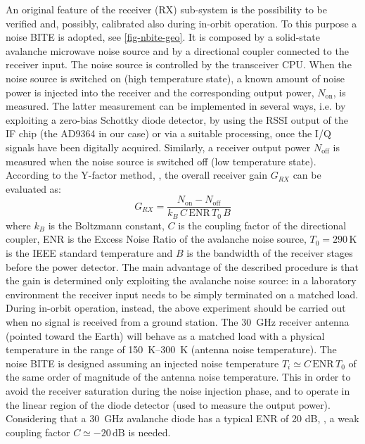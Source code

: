 \documentclass[conference,10pt,a4paper]{IEEEtran}%
\begin{document}
An original feature of the receiver (RX) sub-system is the possibility to be verified and, possibly, calibrated also during in-orbit operation.
To this purpose a noise BITE is adopted, see \cref{fig-nbite-geo}.
It is composed by a solid-state avalanche microwave noise source and by a directional coupler connected to the receiver input.
The noise source is controlled by the transceiver CPU.
When the noise source is switched on (high temperature state), a known amount of noise power is injected into the receiver and the corresponding output power, $N_\text{on}$, is measured.
The latter measurement can be implemented in several ways, i.e. by exploiting a zero-bias Schottky diode detector, by using the RSSI output of the IF chip (the AD9364 in our case) or via a suitable processing, once the I/Q signals have been digitally acquired.
Similarly, a receiver output power $N_\text{off}$ is measured when the noise source is switched off (low temperature state).
According to the Y-factor method, \cite{agilent_AN57-1, Alimenti2008}, the overall receiver gain $G_{RX}$ can be evaluated as:
\begin{equation}
   G_{RX} = \frac{N_\text{on} - N_\text{off}}{k_{B}\,C\,\mbox{ENR}\,T_{0}\,B}
   \label{eqn_RX_gain}
\end{equation}
where $k_{B}$ is the Boltzmann constant, $C$ is the coupling factor of the directional coupler, ENR is the Excess Noise Ratio of the avalanche noise source, $T_{0}=290\,\mbox{K}$ is the IEEE standard temperature and $B$ is the bandwidth of the receiver stages before the power detector.
The main advantage of the described procedure is that the gain is determined only exploiting the avalanche noise source: in a laboratory environment the receiver input needs to be simply terminated on a matched load.
During in-orbit operation, instead, the above experiment should be carried out when no signal is received from a ground station.
The \SI{30}{\GHz} receiver antenna (pointed toward the Earth) will behave as a matched load with a physical temperature in the range of \SIrange{150}{300}{\kelvin} (antenna noise temperature).
The noise BITE is designed assuming an injected noise temperature $T_i \simeq C\,\text{ENR}\,T_{0}$ of the same order of magnitude of the antenna noise temperature.
This in order to avoid the receiver saturation during the noise injection phase, and to operate in the linear region of the diode detector (used to measure the output power).
Considering that a 30~GHz avalanche diode has a typical ENR of 20 dB, \cite{noisecom_NC407B,Alimenti2016}, a weak coupling factor $C \simeq -20\,\mbox{dB}$ is needed.
\end{document}
